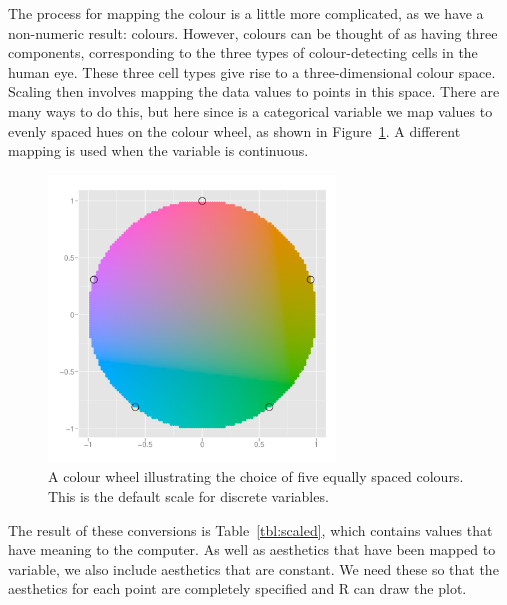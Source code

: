 The process for mapping the colour is a little more complicated, as we have a non-numeric result: colours. However, colours can be thought of as having three components, corresponding to the three types of colour-detecting cells in the human eye. These three cell types give rise to a three-dimensional colour space. Scaling then involves mapping the data values to points in this space. There are many ways to do this, but here since  is a categorical variable we map values to evenly spaced hues on the colour wheel, as shown in Figure~\ref{fig:colour-wheel}. A different mapping is used when the variable is continuous. 

\begin{figure}[htbp]
  \centering
    \includegraphics[width=3in]{colour-wheel}
  \caption{A colour wheel illustrating the choice of five equally spaced colours.   This is the default scale for discrete variables.}
  \label{fig:colour-wheel}
\end{figure}

The result of these conversions is Table~\ref{tbl:scaled}, which contains values that have meaning to the computer. As well as aesthetics that have been mapped to variable, we also include aesthetics that are constant. We need these so that the aesthetics for each point are completely specified and R can draw the plot.



